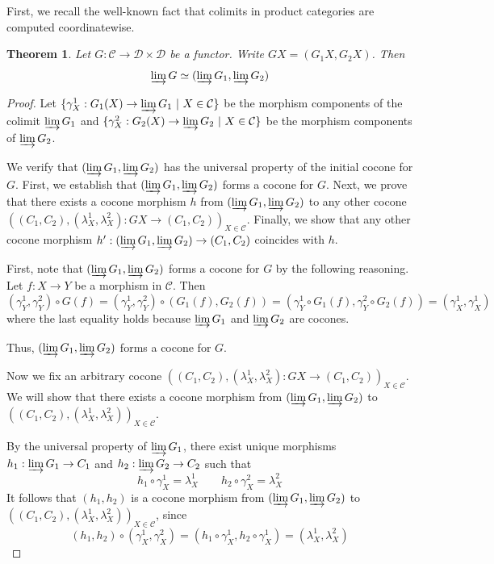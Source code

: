 \documentclass{msthesis}
\newtheorem{theorem}{Theorem}[section]
\theoremstyle{definition}
\newcommand{\mcC}{\mathcal{C}}
\newcommand{\mcD}{\mathcal{D}}
\newcommand{\colim}{\varinjlim}
\begin{document}
First, we recall the well-known fact that colimits in product categories are computed coordinatewise.

\begin{theorem}\label{thm:productcolmits}
    Let $G : \mcC \to \mcD \times \mcD$ be a functor. Write $GX = (G_1 X, G_2 X)$.  Then
    \[\varinjlim G \simeq (\varinjlim G_1, \varinjlim G_2)\]
\end{theorem}

\begin{proof}
Let $\{ \gamma_X^1 : G_1(X) \to \colim G_1\ |\ X \in \mcC\}$ be the morphism components of the colimit $\varinjlim G_1$ and $\{ \gamma_X^2: G_2(X) \to \colim G_2\ |\ X \in \mcC\}$ be the morphism components of $\varinjlim G_2$.

We verify that $(\varinjlim G_1, \varinjlim G_2)$ has the universal property of the initial cocone for $G$.  First, we establish that $(\varinjlim G_1, \varinjlim G_2)$ forms a cocone for $G$.  Next, we prove that there exists a cocone morphism $h$ from $(\varinjlim G_1, \varinjlim G_2)$ to any other cocone $((C_1,C_2), (\lambda^1_X, \lambda_X^2) : GX \to (C_1, C_2))_{X \in \mcC}$.  Finally, we show that any other cocone morphism $h' : (\varinjlim G_1, \varinjlim G_2) \to (C_1, C_2)$ coincides with $h$.

First, note that $(\varinjlim G_1, \varinjlim G_2)$ forms a cocone for $G$ by the following reasoning.  Let $f : X \to Y$ be a morphism in $\mcC$. Then
\[ (\gamma^1_Y, \gamma^2_Y) \circ G (f) = (\gamma^1_Y, \gamma^2_Y) \circ (G_1(f), G_2(f)) = (\gamma^1_Y \circ G_1(f), \gamma^2_Y \circ G_2(f))  = (\gamma^1_X, \gamma^1_X)\]
where the last equality holds because $\varinjlim G_1$ and $\varinjlim G_2$ are cocones. 

Thus, $(\varinjlim G_1, \varinjlim G_2)$ forms a cocone for $G$.

Now we fix an arbitrary cocone $((C_1, C_2), (\lambda^1_X, \lambda_X^2) : G X \to (C_1, C_2))_{X \in \mcC}$.
We will show that there exists a cocone morphism from $(\varinjlim G_1, \varinjlim G_2)$ to $((C_1, C_2), (\lambda^1_X, \lambda_X^2))_{X \in \mcC}$.

By the universal property of $\varinjlim G_1$, there exist unique morphisms $h_1 : \varinjlim G_1 \to C_1$ and $h_2 : \varinjlim G_2 \to C_2$ such that
\[ h_1 \circ \gamma^1_X = \lambda^1_X  \qquad h_2 \circ \gamma^2_X = \lambda^2_X \]
It follows that $(h_1, h_2)$ is a cocone morphism from $(\varinjlim G_1, \varinjlim G_2)$ to $((C_1, C_2), (\lambda^1_X, \lambda^2_X))_{X \in \mcC}$, since
\[ (h_1, h_2) \circ (\gamma^1_X, \gamma^2_X) = (h_1 \circ \gamma^1_X, h_2 \circ \gamma^1_X) = (\lambda^1_X, \lambda^2_X) \]


\end{proof}
\end{document}
